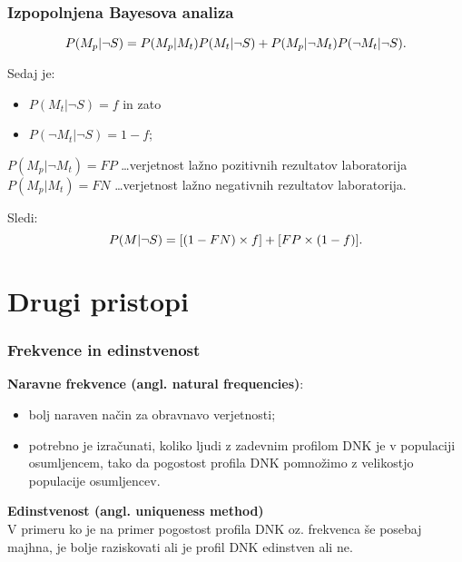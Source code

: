 \documentclass{beamer}
\begin{document}
\begin{frame}
  \frametitle{Izpopolnjena Bayesova analiza}
\[P(M_p \lvert \neg S) = P(M_p \lvert M_t)P(M_t \lvert \neg S) + P(M_p \lvert \neg M_t)P(\neg M_t \lvert \neg S). \vspace{3mm}\]
  
Sedaj je:
\begin{itemize}
  \item $P(M_t \lvert \neg S) = f$ in zato
  \item $P(\neg M_t \lvert \neg S) = 1-f$; \vspace{2mm}
\end{itemize}  
$P(M_p \lvert \neg M_t) = FP$ \dots verjetnost lažno pozitivnih rezultatov laboratorija\\
$P(M_p \lvert M_t) =  FN$  \dots verjetnost lažno negativnih rezultatov laboratorija. \vspace{3mm}

Sledi: \vspace{2mm}
  \[P(M \lvert \neg S) = [(1 - FN) \times f] + [FP \times (1 - f)]. \vspace{3mm}\]
\end{frame}

\section{Drugi pristopi}

\begin{frame}
  \frametitle{Frekvence in edinstvenost}
\textbf{Naravne frekvence (angl. natural frequencies)}:
\begin{itemize}
  \item bolj naraven način za obravnavo verjetnosti;
  \item potrebno je izračunati, koliko ljudi z zadevnim profilom DNK je v populaciji osumljencem, tako da pogostost profila DNK pomnožimo z 
  velikostjo populacije osumljencev.  \\ \vspace{3mm}
\end{itemize}

\textbf{Edinstvenost (angl. uniqueness method)} \\
V primeru ko je na primer pogostost profila DNK oz. frekvenca še posebaj majhna, je bolje raziskovati ali je profil DNK edinstven ali ne. 
\end{frame}
\end{document}
